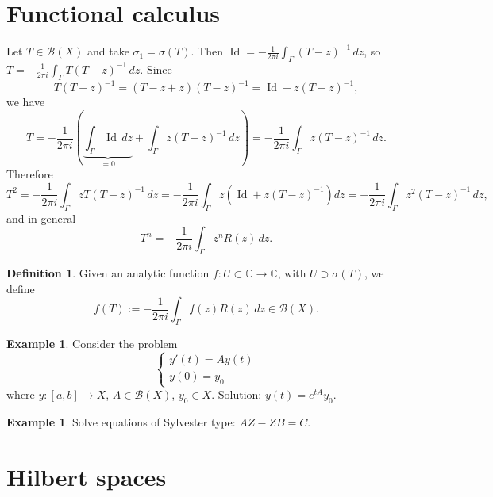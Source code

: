 \documentclass[12pt]{article}
\DeclareMathOperator{\Id}{Id}
\newcommand{\C}{\mathbb{C}}
\newcommand{\cB}{\mathcal{B}}
\theoremstyle{definition}
\newtheorem{defn}[thm]{Definition}
\newtheorem{ex}[thm]{Example}
\begin{document}
\section{Functional calculus}

Let $T \in \cB(X)$ and take $\sigma_1 = \sigma(T)$.
Then $\Id = -\frac{1}{2\pi i} \int_\Gamma (T-z)^{-1} \, dz$, so $T = -\frac{1}{2\pi i} \int_\Gamma T(T-z)^{-1} \, dz$.
Since
\begin{equation*}
	T(T-z)^{-1} = (T - z + z)(T-z)^{-1} = \Id + z(T-z)^{-1},
\end{equation*}
we have
\begin{equation*}
	T = -\frac{1}{2\pi i} \left( \underbrace{\int_\Gamma \Id \, dz}_{=0} + \int_\Gamma z (T-z)^{-1} \, dz \right) = -\frac{1}{2\pi i} \int_\Gamma z (T-z)^{-1} \, dz.
\end{equation*}
Therefore
\begin{equation*}
	T^2 = -\frac{1}{2\pi i} \int_\Gamma z T (T-z)^{-1} \, dz = -\frac{1}{2\pi i} \int_\Gamma z \left( \Id + z(T-z)^{-1} \right) dz = -\frac{1}{2\pi i} \int_\Gamma z^2 (T-z)^{-1} \, dz,
\end{equation*}
and in general
\begin{equation*}
	T^n = -\frac{1}{2\pi i} \int_\Gamma z^n R(z) \, dz.
\end{equation*}

\begin{defn}
	Given an analytic function $f : U \subset \C \to \C$, with $U \supset \sigma(T)$, we define
	\begin{equation*}
		f(T) := -\frac{1}{2\pi i} \int_\Gamma f(z) R(z) \, dz \in \cB(X).
	\end{equation*}
\end{defn}

\begin{ex}
	Consider the problem
	\begin{equation*}
		\begin{cases}
			y'(t) = A y(t) \\
			y(0) = y_0
		\end{cases}
	\end{equation*}
	where $y : [a,b] \to X$, $A \in \cB(X)$, $y_0 \in X$.
	Solution: $y(t) = e^{tA} y_0$.
\end{ex}

\begin{ex}
	Solve equations of Sylvester type: $AZ - ZB = C$.
\end{ex}

\section{Hilbert spaces}
\end{document}
